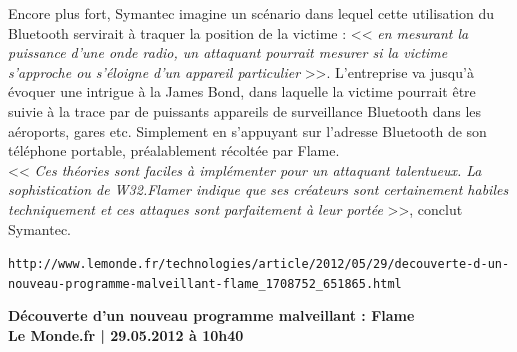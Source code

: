 \documentclass[11pt,twoside,a4paper]{article}
\begin{document}
Encore plus fort, Symantec imagine un sc{\'e}nario dans lequel cette utilisation du Bluetooth servirait {\`a} traquer la position de la victime : << \emph{en mesurant la puissance d'une onde radio, un attaquant pourrait mesurer si la victime s'approche ou s'{\'e}loigne d'un appareil particulier} >>. L'entreprise va jusqu'{\`a} {\'e}voquer une intrigue {\`a} la James Bond, dans laquelle la victime pourrait {\^e}tre suivie {\`a} la trace par de puissants appareils de surveillance Bluetooth dans les a{\'e}roports, gares etc. Simplement en s'appuyant sur l'adresse Bluetooth de son t{\'e}l{\'e}phone portable, pr{\'e}alablement r{\'e}colt{\'e}e par Flame.~\\

<< \emph{Ces th{\'e}ories sont faciles {\`a} impl{\'e}menter pour un attaquant talentueux. La sophistication de W32.Flamer indique que ses cr{\'e}ateurs sont certainement habiles techniquement et ces attaques sont parfaitement {\`a} leur port{\'e}e} >>, conclut Symantec.~\\


\clearpage

\texttt{http://www.lemonde.fr/technologies/article/2012/05/29/decouverte-d-un-nouveau-programme-malveillant-flame\_1708752\_651865.html}

\textbf{\LARGE D{\'e}couverte d'un nouveau programme malveillant : Flame}~\\

\textbf{\small Le Monde.fr | 29.05.2012 {\`a} 10h40}~\\
\end{document}
